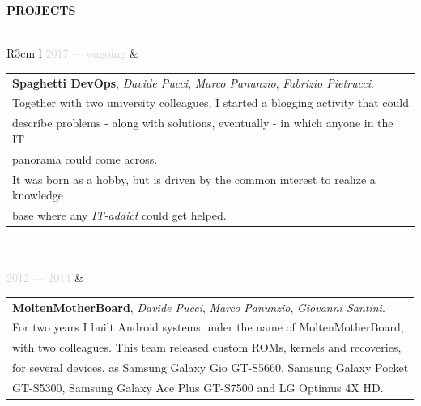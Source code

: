 \documentclass{article}
\begin{document}
\textbf{\textcolor{deepblue}{PROJECTS}} \\\\ \hfill
\begin{tabular}{ R{3cm} l }
	\textcolor{lightgray}{2017 — ongoing} &
	\begin{tabular}[l]{@{}l@{}} %
	\textbf{Spaghetti DevOps}, \textit{Davide Pucci}, \textit{Marco Panunzio}, \textit{Fabrizio Pietrucci}. \\
	Together with two university colleagues, I started a blogging activity that could \\
	describe problems - along with solutions, eventually - in which anyone in the IT \\
	panorama could come across. \\
	It was born as a hobby, but is driven by the common interest to realize a knowledge \\
	base where any \textit{IT-addict} could get helped.
\end{tabular} \\\\ \hfill
\textcolor{lightgray}{2012 — 2014} &
\begin{tabular}[l]{@{}l@{}} %
	\textbf{MoltenMotherBoard}, \textit{Davide Pucci}, \textit{Marco Panunzio}, \textit{Giovanni Santini}. \\
	For two years I built Android systems under the name of MoltenMotherBoard,                             \\
	with two colleagues. This team released custom ROMs, kernels and recoveries,                           \\
	for several devices, as Samsung Galaxy Gio GT-S5660, Samsung Galaxy Pocket                             \\
	GT-S5300, Samsung Galaxy Ace Plus GT-S7500 and LG Optimus 4X HD.
\end{tabular} \\\\ \hfill
\end{tabular}
\end{document}
